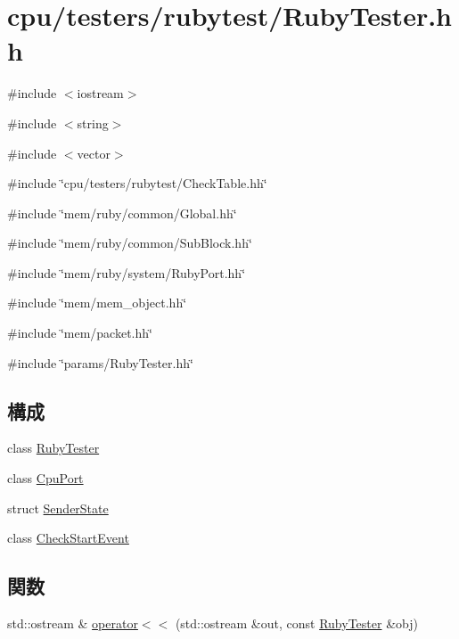 \hypertarget{RubyTester_8hh}{
\section{cpu/testers/rubytest/RubyTester.hh}
\label{RubyTester_8hh}
}
{\ttfamily \#include $<$iostream$>$}\par
{\ttfamily \#include $<$string$>$}\par
{\ttfamily \#include $<$vector$>$}\par
{\ttfamily \#include \char`\"{}cpu/testers/rubytest/CheckTable.hh\char`\"{}}\par
{\ttfamily \#include \char`\"{}mem/ruby/common/Global.hh\char`\"{}}\par
{\ttfamily \#include \char`\"{}mem/ruby/common/SubBlock.hh\char`\"{}}\par
{\ttfamily \#include \char`\"{}mem/ruby/system/RubyPort.hh\char`\"{}}\par
{\ttfamily \#include \char`\"{}mem/mem\_\-object.hh\char`\"{}}\par
{\ttfamily \#include \char`\"{}mem/packet.hh\char`\"{}}\par
{\ttfamily \#include \char`\"{}params/RubyTester.hh\char`\"{}}\par
\subsection*{構成}
\begin{DoxyCompactItemize}
\item 
class \hyperlink{classRubyTester}{RubyTester}
\item 
class \hyperlink{classRubyTester_1_1CpuPort}{CpuPort}
\item 
struct \hyperlink{structRubyTester_1_1SenderState}{SenderState}
\item 
class \hyperlink{classRubyTester_1_1CheckStartEvent}{CheckStartEvent}
\end{DoxyCompactItemize}
\subsection*{関数}
\begin{DoxyCompactItemize}
\item 
std::ostream \& \hyperlink{RubyTester_8hh_ab036363b66335c1423674098737740cf}{operator$<$$<$} (std::ostream \&out, const \hyperlink{classRubyTester}{RubyTester} \&obj)
\end{DoxyCompactItemize}


